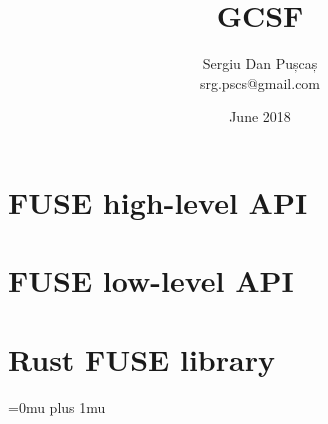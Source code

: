 \documentclass[a4paper,12pt,titlepage,openany]{book}
\title{GCSF}
\author{Sergiu Dan Pușcaș \\ srg.pscs@gmail.com}
\date{June 2018}
\begin{document}

\maketitle
\tableofcontents







\begin{appendices}
\chapter{FUSE high-level API} \label{appendix:fuse_high_level}


\chapter{FUSE low-level API} \label{appendix:fuse_low_level}


\chapter{Rust FUSE library} \label{appendix:rust_fuse}

\end{appendices}

\Urlmuskip=0mu plus 1mu\relax


\end{document}
